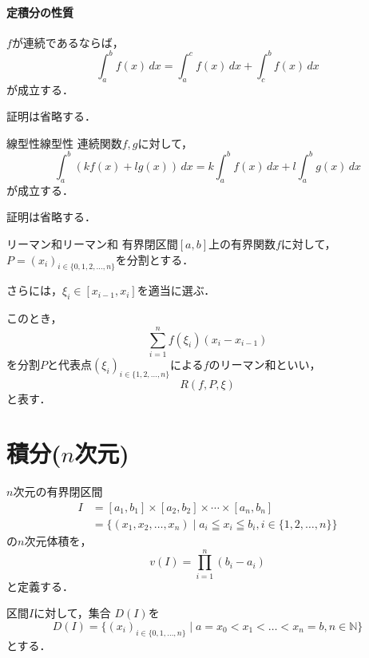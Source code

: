 \subsection{定積分の性質}

\begin{prop}{}{}
  $f$が連続であるならば，
  \[
    \int_{a}^{b} f(x)\, dx = \int_{a}^{c} f(x)\, dx + \int_{c}^{b} f(x)\, dx
  \]
  が成立する．
\end{prop}

証明は省略する．

\begin{prop}{線型性}{線型性}
  連続関数$f,g$に対して，
  \[
    \int_{a}^{b} (kf(x)+lg(x))\, dx = k\int_{a}^{b} f(x)\, dx + l\int_{a}^{b} g(x)\, dx
  \]
  が成立する．
\end{prop}

証明は省略する．

\begin{definition}{リーマン和}{リーマン和}
  有界閉区間$[a,b]$上の有界関数$f$に対して，$P=(x_i)_{i \in \{0,1,2,\ldots,n\}}$を分割とする．

  さらには，$\xi_i \in [x_{i-1},x_i]$を適当に選ぶ．

  このとき，
  \[
    \sum_{i=1}^{n} f(\xi_i)(x_i - x_{i-1})
  \]
  を分割$P$と代表点$(\xi_i)_{i \in \{1,2,\ldots,n\} }$による$f$のリーマン和といい，
  \[
    R(f,P,\xi)
  \]
  と表す．
\end{definition}

\part*{\texorpdfstring{積分($n$次元)}{積分(n次元)}}

\begin{definition}{}{}
  $n$次元の有界閉区間
  \begin{align*}
  I&=[a_1,b_1] \times [a_2,b_2] \times \cdots \times [a_n,b_n] \\
  & = \{ (x_1,x_2,\ldots,x_n) \mid a_i \leqq x_i \leqq b_i , i \in \{1,2,\dots,n \} \}
  \end{align*}
  の$n$次元体積を，
  \[
    v(I) = \prod_{i=1}^{n} (b_i-a_i)
  \]
  と定義する．
\end{definition}

\begin{definition}{}{}
  区間$I$に対して，集合 $D(I)$を
  \[
    D(I) = \{ (x_i)_{i \in \{0,1,\ldots,n \}} \mid a=x_0 < x_1<\dots < x_n =b , n \in \mathbb{N} \}
  \]
  とする．
\end{definition}

